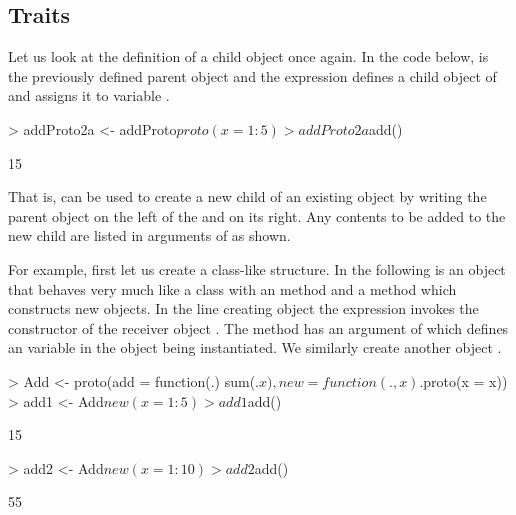 \documentclass{Z}
\begin{document}
\subsection{Traits}
\label{sec:traits}

Let us look at the definition of a child object once again.
In the code below,
 is the previously defined parent object
and the expression  defines
a child object of  and assigns it to variable
.

\begin{Schunk}
\begin{Sinput}
> addProto2a <- addProto$proto(x = 1:5)
> addProto2a$add()
\end{Sinput}
\begin{Soutput}
[1] 15
\end{Soutput}
\end{Schunk}

That is,  can be used to create a new child of
an existing object by writing the 
parent object on the left of the \code{\$} and 
 on its right.  Any contents to
be added to the new child are listed in arguments of 
as shown.

For example, first let us create a class-like structure.  In the
following  is an object that behaves very much like a class
with an  method and a method  which constructs
new objects.  In the line creating object  the expression
 invokes the  constructor of the
receiver object . The method  has an argument of
 which defines an  variable in the 
object being instantiated. We similarly create another object
.

\begin{Schunk}
\begin{Sinput}
> Add <- proto(add = function(.) sum(.$x), new = function(., x) .$proto(x = x))
> add1 <- Add$new(x = 1:5)
> add1$add()
\end{Sinput}
\begin{Soutput}
[1] 15
\end{Soutput}
\begin{Sinput}
> add2 <- Add$new(x = 1:10)
> add2$add()
\end{Sinput}
\begin{Soutput}
[1] 55
\end{Soutput}
\end{Schunk}
\end{document}
